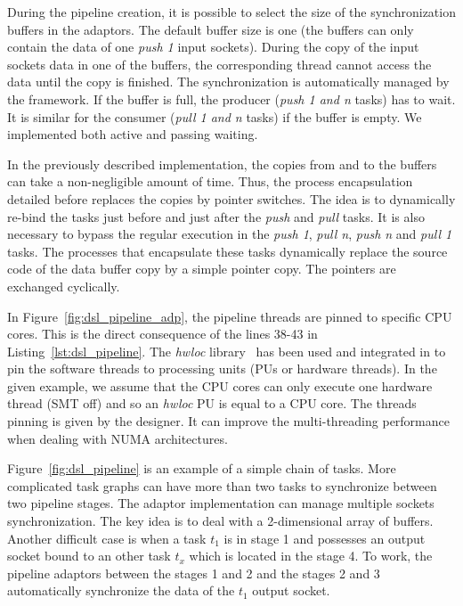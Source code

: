 During the pipeline creation, it is possible to select the size of the
synchronization buffers in the adaptors. The default buffer size is one (the
buffers can only contain the data of one \emph{push 1} input sockets). During
the copy of the input sockets data in one of the buffers, the corresponding
thread cannot access the data until the copy is finished. The synchronization is
automatically managed by the framework. If the buffer is full, the producer
(\emph{push 1 and n} tasks) has to wait. It is similar for the consumer
(\emph{pull 1 and n} tasks) if the buffer is empty. We implemented both active
and passing waiting.

In the previously described implementation, the copies from and to the buffers
can take a non-negligible amount of time. Thus, the process encapsulation
detailed before replaces the copies by pointer switches. The idea is to
dynamically re-bind the tasks just before and just after the \emph{push} and
\emph{pull} tasks. It is also necessary to bypass the regular execution in the
\emph{push 1}, \emph{pull n}, \emph{push n} and \emph{pull 1} tasks. The
processes that encapsulate these tasks dynamically replace the source code of
the data buffer copy by a simple pointer copy. The pointers are exchanged
cyclically.

In Figure~\ref{fig:dsl_pipeline_adp}, the pipeline threads are pinned to
specific CPU cores. This is the direct consequence of the lines 38-43 in
Listing~\ref{lst:dsl_pipeline}. The \emph{hwloc} library~\cite{Broquedis2010}
has been used and integrated in \AFFECT to pin the software threads to
processing units (PUs or hardware threads). In the given example, we assume that
the CPU cores can only execute one hardware thread (SMT off) and so an
\emph{hwloc} PU is equal to a CPU core. The threads pinning is given by the
designer. It can improve the multi-threading performance when dealing with NUMA
architectures.

Figure~\ref{fig:dsl_pipeline} is an example of a simple chain of tasks. More
complicated task graphs can have more than two tasks to synchronize between two
pipeline stages. The adaptor implementation can manage multiple sockets
synchronization. The key idea is to deal with a 2-dimensional array of buffers.
Another difficult case is when a task $t_1$ is in stage 1 and possesses an
output socket bound to an other task $t_{x}$ which is located in the stage 4.
To work, the pipeline adaptors between the stages 1 and 2 and the stages 2 and 3
automatically synchronize the data of the $t_1$ output socket.

